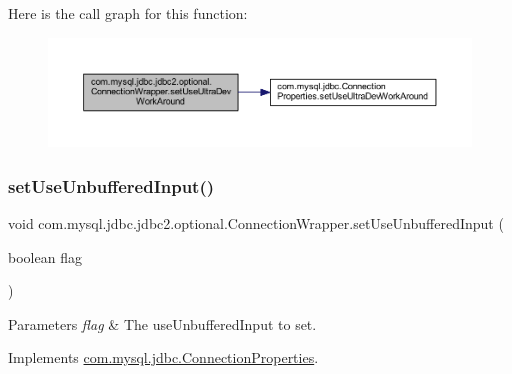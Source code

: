 Here is the call graph for this function\+:
\nopagebreak
\begin{figure}[H]
\begin{center}
\leavevmode
\includegraphics[width=350pt]{classcom_1_1mysql_1_1jdbc_1_1jdbc2_1_1optional_1_1_connection_wrapper_a975975f724eda5350e1b096e2525a70c_cgraph}
\end{center}
\end{figure}
\mbox{\label{classcom_1_1mysql_1_1jdbc_1_1jdbc2_1_1optional_1_1_connection_wrapper_ad2f5596971575bf1d10abdea85e86509}} 
\subsubsection{\texorpdfstring{set\+Use\+Unbuffered\+Input()}{setUseUnbufferedInput()}}
{\footnotesize\ttfamily void com.\+mysql.\+jdbc.\+jdbc2.\+optional.\+Connection\+Wrapper.\+set\+Use\+Unbuffered\+Input (\begin{DoxyParamCaption}\item[{boolean}]{flag }\end{DoxyParamCaption})}


\begin{DoxyParams}{Parameters}
{\em flag} & The use\+Unbuffered\+Input to set. \\
\hline
\end{DoxyParams}


Implements \mbox{\hyperlink{interfacecom_1_1mysql_1_1jdbc_1_1_connection_properties_a5a30b9513cdbfaf75d822a3942c5bf6b}{com.\+mysql.\+jdbc.\+Connection\+Properties}}.


